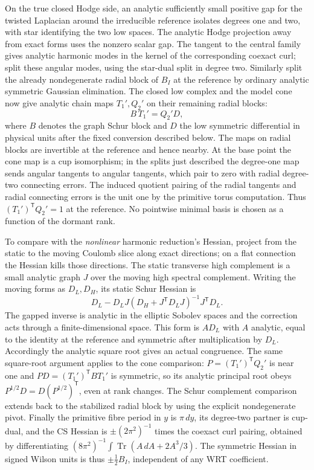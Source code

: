 On the true closed Hodge side, an analytic sufficiently small
positive gap for the twisted Laplacian around the irreducible
reference isolates degrees one and two, with star identifying
the two low spaces. The analytic Hodge projection away from
exact forms uses the nonzero scalar gap. The tangent to the
central family gives analytic harmonic modes in the kernel of
the corresponding coexact curl; split these angular modes,
using the star-dual split in degree two. Similarly split the
already nondegenerate radial block of \(B_I\) at the reference
by ordinary analytic symmetric Gaussian elimination. The closed
low complex and the model cone now give analytic chain maps
\(T_1',Q_2'\) on their remaining radial blocks:
\[
       B\,T_1'=Q_2'D ,
\]
where \(B\) denotes the graph Schur block and \(D\) the low
symmetric differential in physical units after the fixed
conversion described below. The maps on radial blocks are
invertible at the reference and hence nearby. At the base
point the cone map is a cup isomorphism; in the splits just
described the degree-one map sends angular tangents to angular
tangents, which pair to zero with radial degree-two connecting
errors. The induced quotient pairing of the radial tangents
and radial connecting errors is the unit one by the primitive
torus computation. Thus
\((T_1')^{\mathsf T}Q_2'=1\) at the reference. No pointwise
minimal basis is chosen as a function of the dormant rank.

To compare with the \emph{nonlinear} harmonic reduction's Hessian,
project from the static to the moving Coulomb slice along exact
directions; on a flat connection the Hessian kills those
directions. The static transverse high complement is a small
analytic graph \(J\) over the moving high spectral complement.
Writing the moving forms as \(D_L,D_H\), its static Schur
Hessian is
\[
 D_L-D_LJ(D_H+J^{\mathsf T}D_LJ)^{-1}J^{\mathsf T}D_L.
\]
The gapped inverse is analytic in the elliptic Sobolev spaces
and the correction acts through a finite-dimensional space.
This form is \(A D_L\) with \(A\) analytic, equal to the
identity at the reference and symmetric after multiplication
by \(D_L\). Accordingly the analytic square root gives an
actual congruence. The same square-root argument applies to
the cone comparison: \(P=(T_1')^{\mathsf T}Q_2'\) is near
one and \(PD=(T_1')^{\mathsf T}BT_1'\) is symmetric, so its
analytic principal root obeys
\(P^{1/2}D=D(P^{1/2})^{\mathsf T}\), even at rank changes.
The Schur complement comparison extends back to the
stabilized radial block by using the explicit nondegenerate
pivot. Finally the primitive fibre period in \(y\) is
\(\pi\,dy\), its degree-two partner is cup-dual, and the CS
Hessian is \(\pm (2\pi^2)^{-1}\) times the coexact curl
pairing, obtained by differentiating
\((8\pi^2)^{-1}\int\operatorname{Tr}(A\,dA+2A^3/3)\).
The symmetric Hessian in signed Wilson units is thus
\(\pm\tfrac12 B_I\), independent of any WRT coefficient.

